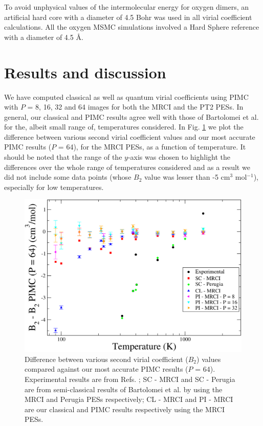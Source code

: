     To avoid unphysical values of the intermolecular energy for oxygen dimers, an artificial hard core with a diameter of 4.5 Bohr was used in all virial coefficient calculations. All the oxygen MSMC simulations involved a Hard Sphere reference with a diameter of 4.5 \AA.
\section{Results and discussion}
    We have computed classical as well as quantum virial coefficients using PIMC with $P$ = 8, 16, 32 and 64 images for both the MRCI and the PT2 PESs. In general, our classical and PIMC results agree well with those of Bartolomei et al. \cite{Bartolomei2010} for the, albeit small range of, temperatures considered. In Fig. \ref{fig:B2O2AllDiffMRCI} we plot the difference between various second virial coefficient values and our most accurate PIMC results ($P$ = 64), for the MRCI PESs, as a function of temperature. It should be noted that the range of the $y$-axis was chosen to highlight the differences over the whole range of temperatures considered and as a result we did not include some data points (whose $B_2$ value was lesser than -5 cm$^3$ mol$^{-1}$), especially for low temperatures. 
    \begin{figure}[!htbp]
        \centering
        \includegraphics[scale=0.20,keepaspectratio]{Chapter-6/Figures/B2O2AllDiffMRCI.png}
        \caption{Difference between various second virial coefficient ($B_2$) values compared against our most accurate PIMC results ($P$ = 64). Experimental results are from Refs. \cite{Bartolomei2010,Dymond}; SC - MRCI and SC - Perugia are from semi-classical results of Bartolomei et al. \cite{Bartolomei2010} by using the MRCI and Perugia PESs \cite{Aquilanti1999} respectively; CL - MRCI and PI - MRCI are our classical and PIMC results respectively using the MRCI PESs.}
        \label{fig:B2O2AllDiffMRCI}
    \end{figure}

